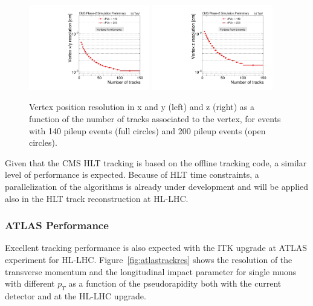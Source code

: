 \begin{figure}[h!tbp]
\begin{center}
  \includegraphics[width=0.47\textwidth]{figures/cmsupgrade/TDR-17-001_fig6_13_a_RecoAllAssoc2GenMatched_ResolX_vs_NumTracks_Sigma_PU.pdf} \hfill
  \includegraphics[width=0.47\textwidth]{figures/cmsupgrade/TDR-17-001_fig6_13_b_RecoAllAssoc2GenMatched_ResolZ_vs_NumTracks_Sigma_PU.pdf}
  \caption{Vertex position resolution in x and y (left) and z (right) as a function of the number of tracks associated to the vertex, for \ttbar events with 140 pileup events (full circles) and 200 pileup events (open circles). 
 }
  \label{fig:cmsvertex}
\end{center}
\end{figure}

Given that the CMS HLT tracking is based on the offline tracking code, a similar level of performance is expected.
Because of HLT time constraints, a parallelization of the algorithms is already under development and will be applied also in the HLT track reconstruction at HL-LHC.

\subsubsection{ATLAS Performance}

Excellent tracking performance is also expected with the ITK upgrade at ATLAS experiment for HL-LHC.
Figure~\ref{fig:atlastrackres} shows the resolution of the transverse momentum and the longitudinal impact parameter
for single muons with different $p_T$ as a function of the pseudorapidity both with the current
detector and at the HL-LHC upgrade. 

